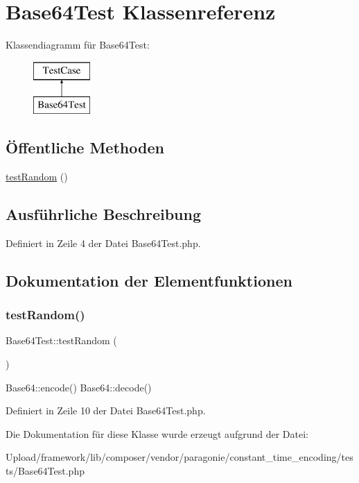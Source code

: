 \hypertarget{class_base64_test}{}\section{Base64\+Test Klassenreferenz}
\label{class_base64_test}
Klassendiagramm für Base64\+Test\+:\begin{figure}[H]
\begin{center}
\leavevmode
\includegraphics[height=2.000000cm]{class_base64_test}
\end{center}
\end{figure}
\subsection*{Öffentliche Methoden}
\begin{DoxyCompactItemize}
\item 
\mbox{\hyperlink{class_base64_test_ac8bacd6c1f307440a690c3d5b1abbbe6}{test\+Random}} ()
\end{DoxyCompactItemize}


\subsection{Ausführliche Beschreibung}


Definiert in Zeile 4 der Datei Base64\+Test.\+php.



\subsection{Dokumentation der Elementfunktionen}
\mbox{\label{class_base64_test_ac8bacd6c1f307440a690c3d5b1abbbe6}} 
\subsubsection{\texorpdfstring{test\+Random()}{testRandom()}}
{\footnotesize\ttfamily Base64\+Test\+::test\+Random (\begin{DoxyParamCaption}{ }\end{DoxyParamCaption})}

Base64\+::encode()  Base64\+::decode() 

Definiert in Zeile 10 der Datei Base64\+Test.\+php.



Die Dokumentation für diese Klasse wurde erzeugt aufgrund der Datei\+:\begin{DoxyCompactItemize}
\item 
Upload/framework/lib/composer/vendor/paragonie/constant\+\_\+time\+\_\+encoding/tests/Base64\+Test.\+php\end{DoxyCompactItemize}
